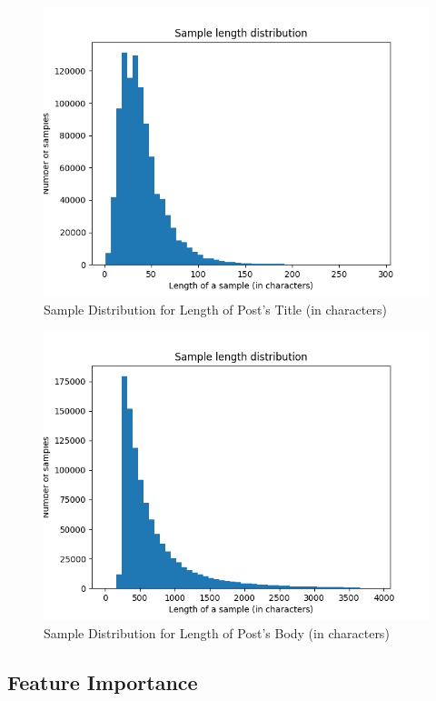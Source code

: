 \documentclass{sig-alternate-05-2015}
\begin{document}
\begin{figure}[H]
\centering
\includegraphics[width=\linewidth]{plots/sample-length-distribution-title-1000000.png}
\caption{Sample Distribution for Length of Post's Title (in characters)}
\end{figure}

\begin{figure}[H]
\centering
\includegraphics[width=\linewidth]{plots/sample-length-distribution-selftext-1000000.png}
\caption{Sample Distribution for Length of Post's Body (in characters)}
\end{figure}

\subsection{Feature Importance}
\end{document}
